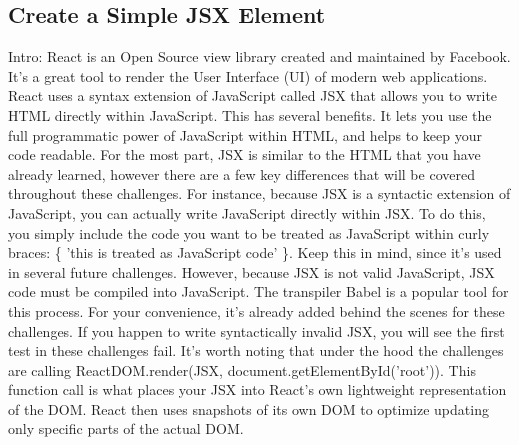 \documentclass{article}%
\begin{document}
\subsection{Create a Simple JSX Element}%
\label{subsec:CreateaSimpleJSXElement}%
Intro: React is an Open Source view library created and maintained by Facebook. It's a great tool to render the User Interface (UI) of modern web applications.\newline%
React uses a syntax extension of JavaScript called JSX that allows you to write HTML directly within JavaScript. This has several benefits. It lets you use the full programmatic power of JavaScript within HTML, and helps to keep your code readable. For the most part, JSX is similar to the HTML that you have already learned, however there are a few key differences that will be covered throughout these challenges.\newline%
For instance, because JSX is a syntactic extension of JavaScript, you can actually write JavaScript directly within JSX. To do this, you simply include the code you want to be treated as JavaScript within curly braces: \{ 'this is treated as JavaScript code' \}. Keep this in mind, since it's used in several future challenges.\newline%
However, because JSX is not valid JavaScript, JSX code must be compiled into JavaScript. The transpiler Babel is a popular tool for this process. For your convenience, it's already added behind the scenes for these challenges. If you happen to write syntactically invalid JSX, you will see the first test in these challenges fail.\newline%
It's worth noting that under the hood the challenges are calling ReactDOM.render(JSX, document.getElementById('root')). This function call is what places your JSX into React's own lightweight representation of the DOM. React then uses snapshots of its own DOM to optimize updating only specific parts of the actual DOM.\newline%

%
\end{document}
